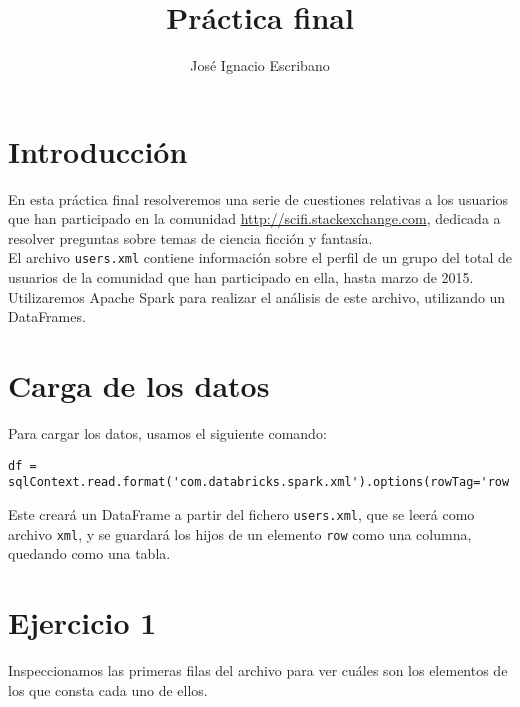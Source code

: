 \documentclass[12pt,a4paper,twoside,openright,titlepage,final]{article}
\author{José Ignacio Escribano}
\title{Práctica final}
\begin{document}
\setcounter{page}{1}


\listoftables
\thispagestyle{empty}
\newpage

\tableofcontents
\thispagestyle{empty}
\newpage


\setcounter{page}{1}

\section{Introducción}

En esta práctica final resolveremos una serie de cuestiones relativas a los usuarios que han participado en la comunidad \url{http://scifi.stackexchange.com}, dedicada a resolver preguntas sobre temas de ciencia ficción y fantasía.\\

El archivo \texttt{users.xml} contiene información sobre el perfil de un grupo del total de usuarios de la comunidad que han participado en ella, hasta marzo de 2015.\\

Utilizaremos Apache Spark para realizar el análisis de este archivo, utilizando un DataFrames.

\section{Carga de los datos}

Para cargar los datos, usamos el siguiente comando:

\begin{verbatim}
df = sqlContext.read.format('com.databricks.spark.xml').options(rowTag='row').load('users.xml')
\end{verbatim}

Este creará un DataFrame a partir del fichero \texttt{users.xml}, que se leerá como archivo \texttt{xml}, y se guardará los hijos de un elemento \texttt{row} como una columna, quedando como una tabla.

\section{Ejercicio 1}

Inspeccionamos las primeras filas del archivo para ver cuáles son los elementos de los que consta cada uno de ellos.
\end{document}

